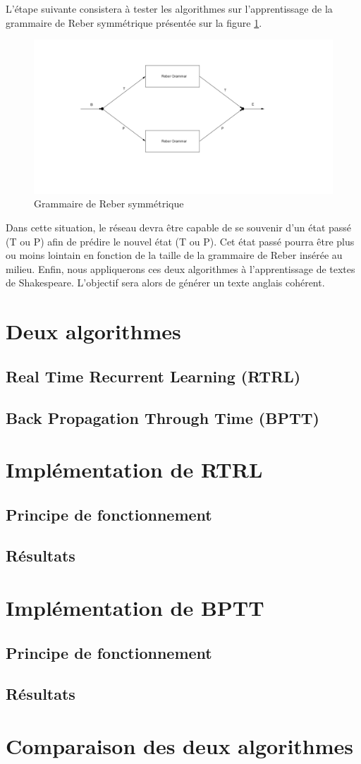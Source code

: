 \documentclass{report}
\begin{document}
\bigbreak
L'étape suivante consistera à tester les algorithmes sur l'apprentissage de la grammaire de Reber symmétrique présentée sur la figure \ref{Grammaire de Reber symmétrique}.  
\begin{figure}[h!]
\begin{center}
\includegraphics[scale=0.5]{images/reber_symmetrique.png}
\caption{Grammaire de Reber symmétrique}
\label{Grammaire de Reber symmétrique}
\end{center}
\end{figure}

Dans cette situation, le réseau devra être capable de se souvenir d'un état passé (T ou P) afin de prédire le nouvel état (T ou P). Cet état passé pourra être plus ou moins lointain en fonction de la taille de la grammaire de Reber insérée au milieu. 
\bigbreak
\bigbreak
Enfin, nous appliquerons ces deux algorithmes à l'apprentissage de textes de Shakespeare. L'objectif sera alors de générer un texte anglais cohérent.
\section{Deux algorithmes}
\subsection{Real Time Recurrent Learning (RTRL)}
\subsection{Back Propagation Through Time (BPTT)}
\section{Implémentation de RTRL}
\subsection{Principe de fonctionnement}
\subsection{Résultats}
\section{Implémentation de BPTT}
\subsection{Principe de fonctionnement}
\subsection{Résultats}
\section{Comparaison des deux algorithmes}
\end{document}
